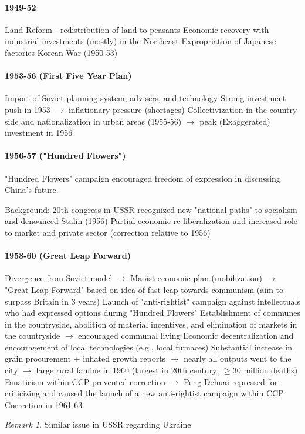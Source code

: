 \documentclass[11pt]{article}
\theoremstyle{definition}
\theoremstyle{remark}
\newtheorem*{remark}{Remark}
\begin{document}
\paragraph{1949-52}
\begin{outline}[enumerate]
\1 Land Reform---redistribution of land to peasants
\1 Economic recovery with industrial investments (mostly) in the Northeast
\1 Expropriation of Japanese factories
\1 Korean War (1950-53)
\end{outline}

\paragraph{1953-56 (First Five Year Plan)}
\begin{outline}[enumerate]
\1 Import of Soviet planning system, advisers, and technology
\1 Strong investment push in 1953 $\to$ inflationary pressure (shortages)
\1 Collectivization in the country side and nationalization in urban areas (1955-56) $\to$ peak (Exaggerated) investment in 1956
\end{outline}

\paragraph{1956-57 ("Hundred Flowers")}
"Hundred Flowers" campaign encouraged freedom of expression in discussing China's future.
\begin{outline}[enumerate]
\1 Background: 20th congress in USSR recognized new "national paths" to socialism and denounced Stalin (1956)
\1 Partial economic re-liberalization and increased role to market and private sector (correction relative to 1956)
\end{outline}

\paragraph{1958-60 (Great Leap Forward)}
\begin{outline}[enumerate]
Divergence from Soviet model $\to$ Maoist economic plan (mobilization) $\to$ "Great Leap Forward" based on idea of fast leap towards communism (aim to surpass Britain in 3 years)
\1 Launch of "anti-rightist" campaign against intellectuals who had expressed options during "Hundred Flowers"
\1 Establishment of communes in the countryside, abolition of material incentives, and elimination of markets in the countryside $\to$ encouraged communal living
	\2 Economic decentralization and encouragement of local technologies (e.g., local furnaces)
\1 Substantial increase in grain procurement + inflated growth reports $\to$ nearly all outputs went to the city $\to$ large rural famine in 1960 (largest in 20th century; $\geq 30$ million deaths)
	\2 Fanaticism within CCP prevented correction $\to$ Peng Dehuai repressed for criticizing and caused the launch of a new anti-rightist campaign within CCP
	\2 Correction in 1961-63
\end{outline}
\begin{remark}
Similar issue in USSR regarding Ukraine
\end{remark}
\end{document}
